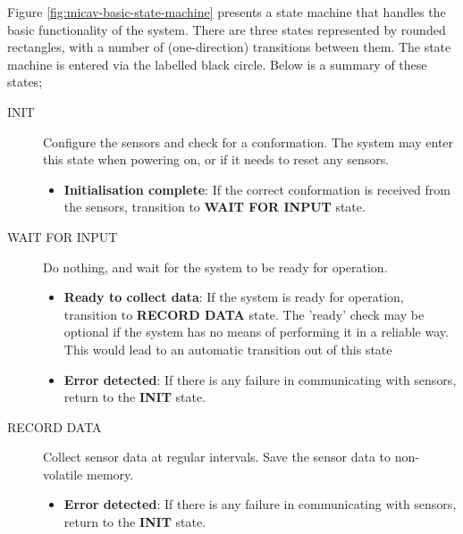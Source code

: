 \documentclass{article}
\begin{document}
        Figure \ref{fig:micav-basic-state-machine} presents a state machine that handles the basic functionality of the system.
        There are three states represented by rounded rectangles, with a number of (one-direction) transitions between them.
        The state machine is entered via the labelled black circle.
        Below is a summary of these states;
        \begin{description}
            \item [INIT] Configure the sensors and check for a conformation. The system may enter this state when powering on, or if it needs to reset any sensors.
            \begin{itemize}
                \item \textbf{Initialisation complete}: If the correct conformation is received from the sensors, transition to \textbf{WAIT FOR INPUT} state.
            \end{itemize}
            \item [WAIT FOR INPUT] Do nothing, and wait for the system to be ready for operation.
            \begin{itemize}
                \item \textbf{Ready to collect data}: If the system is ready for operation, transition to \textbf{RECORD DATA} state. The 'ready' check may be optional if the system has no means of performing it in a reliable way. This would lead to an automatic transition out of this state
                \item \textbf{Error detected}: If there is any failure in communicating with sensors, return to the \textbf{INIT} state.
            \end{itemize}
            \item [RECORD DATA] Collect sensor data at regular intervals. Save the sensor data to non-volatile memory.
            \begin{itemize}
                \item \textbf{Error detected}: If there is any failure in communicating with sensors, return to the \textbf{INIT} state.
            \end{itemize}
        \end{description}
\end{document}
